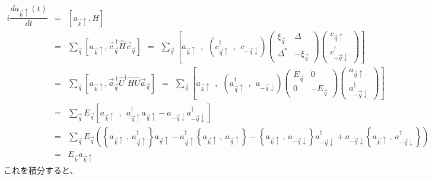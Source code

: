 \documentclass[uplatex,a4j,12pt,dvipdfmx]{jsarticle}
\begin{document}
\begin{eqnarray}
	i \dfrac{d a_{\vec{k}\uparrow}(t)}{dt}
	&=&
	\left[ a_{\vec{k}\uparrow} , H \right]
	\nonumber \\[2mm] &=&
	\sum_{\vec{q}}
	\left[ a_{\vec{k}\uparrow} , \vec{c}_{\vec{q}}^{\ \dagger} \hat{H} \vec{c}_{\vec{q}} \right]
	\ \ = \ \
	\sum_{\vec{q}}
	\left[ a_{\vec{k}\uparrow} \ \ , \ \ \left( c_{\vec{q} \uparrow}^{\dagger} \ \ , \ \ c_{-\vec{q} \downarrow} \right)
		\!\!\!
		\left(
		\begin{array}{cc}
				\xi_{\vec{q}} & \Delta
				\\[3mm]
				\Delta^{*}    & - \xi_{\vec{q}}
			\end{array}
		\right)
		\!\!\!
		\left(
		\!\!
		\begin{array}{c}
				c_{\vec{q} \uparrow}
				\\[3mm]
				c_{-\vec{q} \downarrow}^{\dagger}
			\end{array}
		\!\!
		\right)
		\right]
	\nonumber \\[2mm] &=&
	\sum_{\vec{q}}
	\left[ a_{\vec{k}\uparrow} , \vec{a}_{\vec{q}}^{\ \dagger} \hat{U}^{\dagger} \hat{H} \hat{U} \vec{a}_{\vec{q}} \right]
	\ \ = \ \
	\sum_{\vec{q}}
	\left[ a_{\vec{k}\uparrow} \ \ , \ \ \left( a_{\vec{q} \uparrow}^{\dagger} \ \ , \ \ a_{-\vec{q} \downarrow} \right)
		\!\!\!
		\left(
		\begin{array}{cc}
				E_{\vec{q}} & 0
				\\[3mm]
				0           & - E_{\vec{q}}
			\end{array}
		\right)
		\!\!\!
		\left(
		\!\!
		\begin{array}{c}
				a_{\vec{q} \uparrow}
				\\[3mm]
				a_{-\vec{q} \downarrow}^{\dagger}
			\end{array}
		\!\!
		\right)
		\right]
	\nonumber \\[2mm] &=&
	\sum_{\vec{q}}
	E_{\vec{q}}
	\left[
		a_{\vec{k}\uparrow}
		\ \ , \ \
		a_{\vec{q} \uparrow}^{\dagger} a_{\vec{q} \uparrow} - a_{-\vec{q} \downarrow} a_{-\vec{q} \downarrow}^{\dagger}
		\right]
	\nonumber \\[2mm] &=&
	\sum_{\vec{q}}
	E_{\vec{q}}
	\left(
	\left\{ a_{\vec{k}\uparrow} \ , \ a_{\vec{q} \uparrow}^{\dagger} \right\} a_{\vec{q} \uparrow}
	-
	a_{\vec{q} \uparrow}^{\dagger} \left\{ a_{\vec{k}\uparrow} \ , \ a_{\vec{q} \uparrow} \right\}
	-
	\left\{ a_{\vec{k}\uparrow} \ , \ a_{-\vec{q} \downarrow} \right\} a_{-\vec{q} \downarrow}^{\dagger}
	+
	a_{-\vec{q} \downarrow}  \left\{ a_{\vec{k}\uparrow} \ , \ a_{-\vec{q} \downarrow}^{\dagger} \right\}
	\right)
	\nonumber \\[2mm] &=&
	E_{\vec{k}}
	a_{\vec{k} \uparrow}
\end{eqnarray}
%
これを積分すると、
\end{document}
